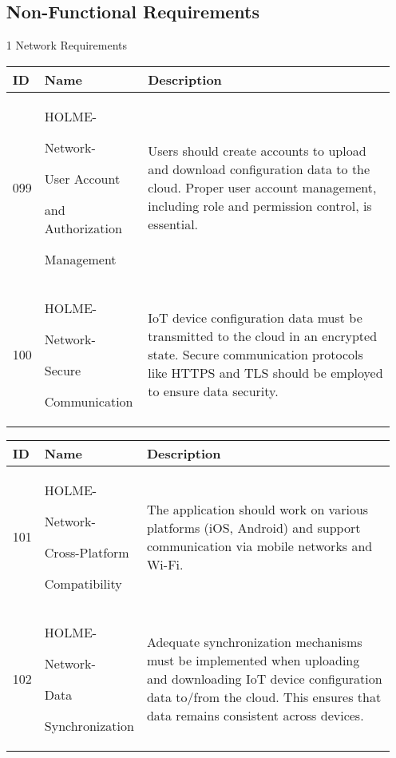 \documentclass[conference]{IEEEtran}
\begin{document}
\begin{enumerate}
\vspace{1cm}
\subsection{Non-Functional Requirements}
\item[1] Network Requirements
\begin{table}[h]
\def\arraystretch{1.2} \small
    \begin{tabular}{|p{1cm}|p{1.8cm}|p{5.0cm}|}
        \hline
        ID & Name & Description\\ \hline
         099 \par  & HOLME-\par Network-\par User Account \par and Authorization  \par Management &Users should create accounts to upload and download configuration data to the cloud. Proper user account management, including role and permission control, is essential.\\ \hline
         100 \par  & HOLME-\par Network-\par Secure \par Communication  & IoT device configuration data must be transmitted to the cloud in an encrypted state. Secure communication protocols like HTTPS and TLS should be employed to ensure data security.  \\ \hline
    \end{tabular}
\end{table}
\vspace{3cm}
\begin{table}[h]
\def\arraystretch{1.2} \small
    \begin{tabular}{|p{1cm}|p{1.8cm}|p{5.0cm}|}
        \hline
        ID & Name & Description\\ \hline
        101 \par  & HOLME-\par Network-\par Cross-Platform \par Compatibility & The application should work on various platforms (iOS, Android) and support communication via mobile networks and Wi-Fi.\\ \hline
         102 \par  & HOLME-\par Network-\par Data \par Synchronization & Adequate synchronization mechanisms must be implemented when uploading and downloading IoT device configuration data to/from the cloud. This ensures that data remains consistent across devices.\\ \hline

\end{tabular}
\end{table}
\end{enumerate}
\end{document}
